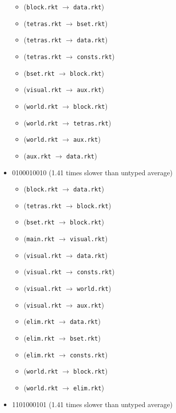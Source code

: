 \documentclass{article}
\newcommand{\mono}[1]{\texttt{#1}}
\begin{document}
\begin{itemize}
  \begin{itemize}
  \item (\mono{block.rkt} $\rightarrow$ \mono{data.rkt})
  \item (\mono{tetras.rkt} $\rightarrow$ \mono{bset.rkt})
  \item (\mono{tetras.rkt} $\rightarrow$ \mono{data.rkt})
  \item (\mono{tetras.rkt} $\rightarrow$ \mono{consts.rkt})
  \item (\mono{bset.rkt} $\rightarrow$ \mono{block.rkt})
  \item (\mono{visual.rkt} $\rightarrow$ \mono{aux.rkt})
  \item (\mono{world.rkt} $\rightarrow$ \mono{block.rkt})
  \item (\mono{world.rkt} $\rightarrow$ \mono{tetras.rkt})
  \item (\mono{world.rkt} $\rightarrow$ \mono{aux.rkt})
  \item (\mono{aux.rkt} $\rightarrow$ \mono{data.rkt})
  \end{itemize}
\item 0100010010 (1.41 times slower than untyped average)
  \begin{itemize}
  \item (\mono{block.rkt} $\rightarrow$ \mono{data.rkt})
  \item (\mono{tetras.rkt} $\rightarrow$ \mono{block.rkt})
  \item (\mono{bset.rkt} $\rightarrow$ \mono{block.rkt})
  \item (\mono{main.rkt} $\rightarrow$ \mono{visual.rkt})
  \item (\mono{visual.rkt} $\rightarrow$ \mono{data.rkt})
  \item (\mono{visual.rkt} $\rightarrow$ \mono{consts.rkt})
  \item (\mono{visual.rkt} $\rightarrow$ \mono{world.rkt})
  \item (\mono{visual.rkt} $\rightarrow$ \mono{aux.rkt})
  \item (\mono{elim.rkt} $\rightarrow$ \mono{data.rkt})
  \item (\mono{elim.rkt} $\rightarrow$ \mono{bset.rkt})
  \item (\mono{elim.rkt} $\rightarrow$ \mono{consts.rkt})
  \item (\mono{world.rkt} $\rightarrow$ \mono{block.rkt})
  \item (\mono{world.rkt} $\rightarrow$ \mono{elim.rkt})
  \end{itemize}
\item 1101000101 (1.41 times slower than untyped average)

\end{itemize}
\end{document}
